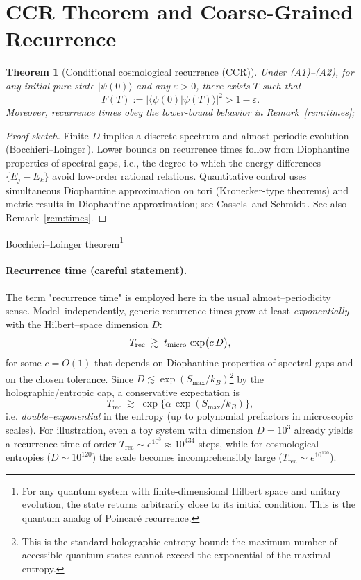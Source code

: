 \documentclass[12pt]{article}
\newcommand{\Smax}{S_{\max}}
\newcommand{\Trec}{T_{\text{rec}}}
\newtheorem{theorem}{Theorem}
\theoremstyle{remark}
\begin{document}
\section{CCR Theorem and Coarse-Grained Recurrence}
\begin{theorem}[Conditional cosmological recurrence (CCR)]\label{thm:CCR}
Under (A1)--(A2), for any initial pure state $|\psi(0)\rangle$ and any $\varepsilon>0$, there exists $T$ such that
\begin{equation}
 F(T):=|\langle\psi(0)|\psi(T)\rangle|^2 > 1-\varepsilon.
\end{equation}
Moreover, recurrence times obey the lower-bound behavior in Remark~\ref{rem:times};
\end{theorem}
\begin{proof}[Proof sketch]
Finite $D$ implies a discrete spectrum and almost-periodic evolution (Bocchieri--Loinger\,\cite{BocchieriLoinger1957}). 
Lower bounds on recurrence times follow from Diophantine properties of spectral gaps, i.e., the degree to which the energy differences $\{E_j{-}E_k\}$ avoid low-order rational relations. Quantitative control uses simultaneous Diophantine approximation on tori (Kronecker-type theorems) and metric results in Diophantine approximation; see Cassels\,\cite{Cassels1957} and Schmidt\,\cite{Schmidt1980}. See also Remark~\ref{rem:times}.
\end{proof}

Bocchieri--Loinger theorem\footnote{For any quantum system with finite-dimensional Hilbert space 
and unitary evolution, the state returns arbitrarily close to its initial condition. 
This is the quantum analog of Poincaré recurrence.}



\paragraph{Recurrence time (careful statement).}
The term "recurrence time" is employed here in the usual almost–periodicity sense. Model–independently, generic recurrence times grow at least \emph{exponentially} with the Hilbert–space dimension $D$:
\[
\Trec \;\gtrsim\; t_{\rm micro}\,\exp\!\big(c\,D\big),
\]
for some $c=O(1)$ that depends on Diophantine properties of spectral gaps and on the chosen tolerance.
Since $D \lesssim \exp(\Smax/k_B)$\footnote{This is the standard holographic entropy bound: the maximum number of accessible quantum states cannot exceed the exponential of the maximal entropy.} by the holographic/entropic cap, a conservative expectation is
\[
\Trec \;\gtrsim\; \exp\!\Big\{\alpha\,\exp(\Smax/k_B)\Big\},
\]
i.e. \emph{double–exponential} in the entropy (up to polynomial prefactors in microscopic scales).
For illustration, even a toy system with dimension $D=10^3$ already yields a 
recurrence time of order $T_{\text{rec}} \sim e^{10^3} \approx 10^{434}$ steps, 
while for cosmological entropies ($D \sim 10^{120}$) the scale becomes 
incomprehensibly large ($T_{\text{rec}} \sim e^{10^{120}}$).
\end{document}
